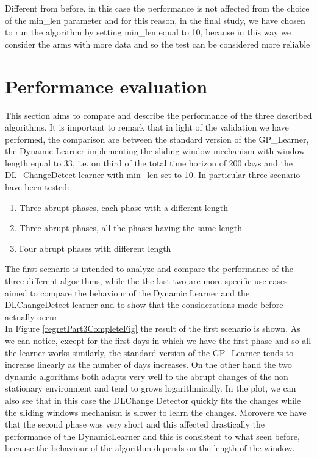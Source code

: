 Different from before, in this case the performance is not affected from the choice of the min\_len parameter and for this reason, in the final study, we have chosen to run the algorithm by setting min\_len equal to 10, because in this way we consider the arms with more data and so the test can be considered more reliable


\section{Performance evaluation}

This section aims to compare and describe the performance of the three described algorithms.
It is important to remark that in light of the validation we have performed, the comparison are between the standard version of the GP\_Learner, the Dynamic Learner implementing the sliding window mechanism with window length equal to 33, i.e. on third of the total time horizon of 200 days and the DL\_ChangeDetect learner with min\_len set to 10.
In particular three scenario have been tested:

\begin{enumerate}
\item Three abrupt phases, each phase with a different length
\item Three abrupt phases, all the phases having the same length
\item Four abrupt phases with different length
\end{enumerate}

The first scenario is intended to analyze and compare the performance of the three different algorithms, while the the last two are more specific use cases aimed to compare the behaviour of the Dynamic Learner and the DLChangeDetect learner and to show that the considerations made before actually occur.\\
In Figure \ref{regretPart3CompleteFig} the result of the first scenario is shown. As we can notice, except for the first days in which we have the first phase and so all the learner works similarly, the standard version of the GP\_Learner tends to increase linearly as the number of days increases. On the other hand the two dynamic algorithms both adapts very well to the abrupt changes of the non stationary environment and tend to grows logarithmically. In the plot, we can also see that in this case the DLChange Detector quickly fits the changes while the sliding windows mechanism is slower to learn the changes. Morovere we have that the second phase was very short and this affected drastically the performance of the DynamicLearner and this is consistent to what seen before, because the behaviour of the algorithm depends on the length of the window. 

